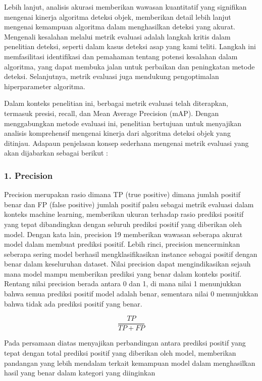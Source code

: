 Lebih lanjut, analisis akurasi memberikan wawasan kuantitatif yang signifikan mengenai kinerja algoritma deteksi objek, memberikan detail lebih lanjut mengenai kemampuan algoritma dalam menghasilkan deteksi yang akurat. Mengenali kesalahan melalui metrik evaluasi adalah langkah kritis dalam penelitian deteksi, seperti dalam kasus deteksi asap yang kami teliti. Langkah ini memfasilitasi identifikasi dan pemahaman tentang potensi kesalahan dalam algoritma, yang dapat membuka jalan untuk perbaikan dan peningkatan metode deteksi. Selanjutnya, metrik evaluasi juga mendukung pengoptimalan hiperparameter algoritma.

Dalam konteks penelitian ini, berbagai metrik evaluasi telah diterapkan, termasuk presisi, recall, dan Mean Average Precision (mAP). Dengan menggabungkan metode evaluasi ini, penelitian bertujuan untuk menyajikan analisis komprehensif mengenai kinerja dari algoritma deteksi objek yang ditinjau. Adapaun penjelasan konsep sederhana mengenai metrik evaluasi yang akan dijabarkan sebagai berikut :

\subsubsection*{1. Precision}
Precision merupakan rasio dimana TP (true positive) dimana jumlah positif benar dan FP (false positive) jumlah positif palsu sebagai metrik evaluasi dalam konteks machine learning, memberikan ukuran terhadap rasio prediksi positif yang tepat dibandingkan dengan seluruh prediksi positif yang diberikan oleh model. Dengan kata lain, precision 19 memberikan wawasan seberapa akurat model dalam membuat prediksi positif. Lebih rinci, precision mencerminkan seberapa sering model berhasil mengklasifikasikan instance sebagai positif dengan benar dalam keseluruhan dataset. Nilai precision dapat mengindikasikan sejauh mana model mampu memberikan prediksi yang benar dalam konteks positif. Rentang nilai precision berada antara 0 dan 1, di mana nilai 1 menunjukkan bahwa semua prediksi positif model adalah benar, sementara nilai 0 menunjukkan bahwa tidak ada prediksi positif yang benar.

\begin{equation}
    \frac{TP}{TP+FP}
\end{equation}

Pada persamaan diatas menyajikan perbandingan antara prediksi positif yang tepat dengan total prediksi positif yang diberikan oleh model, memberikan pandangan yang lebih mendalam terkait kemampuan model dalam menghasilkan hasil yang benar dalam kategori yang diinginkan

